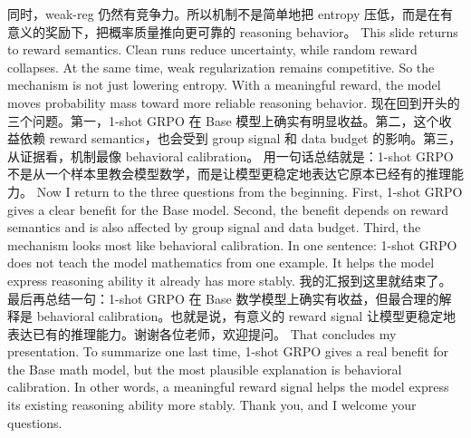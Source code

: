 {}同时，weak-reg 仍然有竞争力。所以机制不是简单地把 entropy 压低，而是在有意义的奖励下，把概率质量推向更可靠的 reasoning behavior。\markdownRendererInterblockSeparator
{}\markdownRendererInterblockSeparator
{}This slide returns to reward semantics. Clean runs reduce uncertainty, while random reward collapses.\markdownRendererInterblockSeparator
{}At the same time, weak regularization remains competitive. So the mechanism is not just lowering entropy. With a meaningful reward, the model moves probability mass toward more reliable reasoning behavior.\markdownRendererInterblockSeparator
{}\markdownRendererHorizontalRule{}\markdownRendererInterblockSeparator
{}\markdownRendererInterblockSeparator
{}\markdownRendererInterblockSeparator
{}现在回到开头的三个问题。第一，1-shot GRPO 在 Base 模型上确实有明显收益。第二，这个收益依赖 reward semantics，也会受到 group signal 和 data budget 的影响。第三，从证据看，机制最像 behavioral calibration。\markdownRendererInterblockSeparator
{}用一句话总结就是：1-shot GRPO 不是从一个样本里教会模型数学，而是让模型更稳定地表达它原本已经有的推理能力。\markdownRendererInterblockSeparator
{}\markdownRendererInterblockSeparator
{}Now I return to the three questions from the beginning. First, 1-shot GRPO gives a clear benefit for the Base model. Second, the benefit depends on reward semantics and is also affected by group signal and data budget. Third, the mechanism looks most like behavioral calibration.\markdownRendererInterblockSeparator
{}In one sentence: 1-shot GRPO does not teach the model mathematics from one example. It helps the model express reasoning ability it already has more stably.\markdownRendererInterblockSeparator
{}\markdownRendererHorizontalRule{}\markdownRendererInterblockSeparator
{}\markdownRendererInterblockSeparator
{}\markdownRendererInterblockSeparator
{}我的汇报到这里就结束了。\markdownRendererInterblockSeparator
{}最后再总结一句：1-shot GRPO 在 Base 数学模型上确实有收益，但最合理的解释是 behavioral calibration。也就是说，有意义的 reward signal 让模型更稳定地表达已有的推理能力。谢谢各位老师，欢迎提问。\markdownRendererInterblockSeparator
{}\markdownRendererInterblockSeparator
{}That concludes my presentation.\markdownRendererInterblockSeparator
{}To summarize one last time, 1-shot GRPO gives a real benefit for the Base math model, but the most plausible explanation is behavioral calibration. In other words, a meaningful reward signal helps the model express its existing reasoning ability more stably. Thank you, and I welcome your questions.\markdownRendererInterblockSeparator
